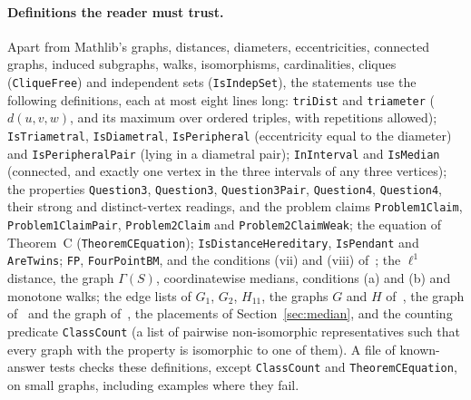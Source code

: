\documentclass[11pt]{article}
\theoremstyle{remark}
\newcommand{\qs}{\textquotesingle}
\begin{document}
\paragraph{Definitions the reader must trust.}
Apart from Mathlib's graphs, distances, diameters, eccentricities, connected
graphs, induced subgraphs, walks, isomorphisms, cardinalities, cliques
(\texttt{CliqueFree}) and independent sets (\texttt{IsIndepSet}), the
statements use the following definitions, each at most eight lines long:
\texttt{triDist} and \texttt{triameter} ($d(u,v,w)$, and its maximum over
ordered triples, with repetitions allowed); \texttt{IsTriametral},
\texttt{IsDiametral}, \texttt{IsPeripheral} (eccentricity equal to the
diameter) and \texttt{IsPeripheralPair} (lying in a diametral pair);
\texttt{InInterval} and \texttt{IsMedian} (connected, and exactly one vertex
in the three intervals of any three vertices); the properties
\texttt{Question3}, \texttt{Question3\qs}, \texttt{Question3\qs Pair},
\texttt{Question4}, \texttt{Question4\qs}, their strong and distinct-vertex
readings, and the problem claims \texttt{Problem1Claim},
\texttt{Problem1ClaimPair}, \texttt{Problem2Claim} and
\texttt{Problem2ClaimWeak}; the equation of Theorem~C
(\texttt{TheoremCEquation}); \texttt{IsDistanceHereditary},
\texttt{IsPendant} and \texttt{AreTwins}; \texttt{FP},
\texttt{FourPointBM}, and the conditions (vii) and (viii) of~\cite{bm};
the $\ell^1$ distance, the graph $\Gamma(S)$, coordinatewise medians,
conditions (a) and (b) and monotone walks; the edge lists of $G_1$, $G_2$,
$H_{11}$, the graphs $G$ and $H$ of~\cite[Figure~3]{hko}, the graph
of~\cite[Figure~2]{hko} and the graph of~\cite{mo-a}, the placements of
Section~\ref{sec:median}, and the counting predicate
\texttt{ClassCount} (a list of pairwise non-isomorphic representatives such
that every graph with the property is isomorphic to one of them). A file of
known-answer tests checks these definitions, except \texttt{ClassCount} and
\texttt{TheoremCEquation}, on small graphs, including examples where they
fail.
\end{document}
